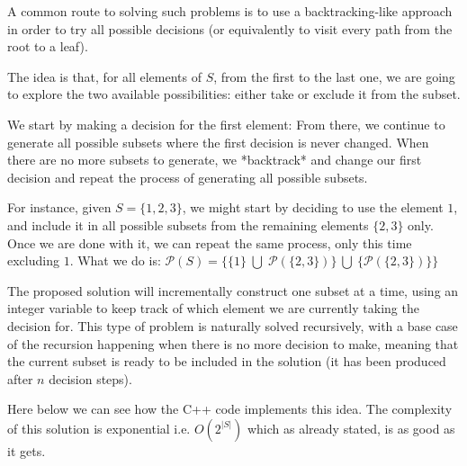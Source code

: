 A common route to solving such problems is to use a backtracking-like approach in order to try all possible
decisions (or equivalently to visit every path from the root to a leaf).

The idea is that, for all elements of $S$, from the first to the last one, we are going to
explore the two available possibilities: either take or exclude
it from the subset.

We start by making a decision for the first element: From there, we continue to generate all possible subsets
where the first decision is never changed. 
When there are no more subsets to generate, we *backtrack* and change our first
decision and repeat the process of generating all possible subsets.


For instance, given $S=\{1,2,3\}$, we might start by deciding to use the element $1$, and include it in all possible subsets from the remaining elements $\{2, 3\}$ only. 
Once we are done with it, we can repeat the same process, only this time excluding $1$. What we do is: $\mathcal{P}(S)= \{\{1\} \; \bigcup \;\mathcal{P}(\{2,3\})\} \: \bigcup \: \{\mathcal{P}(\{2,3\})\}\} 
$

The proposed solution will incrementally construct one subset at a time, 
using an integer variable to keep track of which element we are currently taking the decision for.
This type of problem is naturally solved recursively, with a base case of the recursion happening when there is no more decision
to make, meaning that the current subset is ready to be included in the solution (it has been
produced after $n$ decision steps).

Here below we can see how the C++ code implements this idea. The complexity of this solution is exponential i.e. $O(2^{|S|})$ which as already stated, is as good as
it gets.





